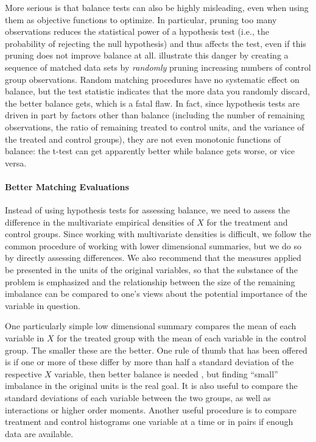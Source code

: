 \documentclass[11pt,titlepage]{article}
\begin{document}
More serious is that balance tests can also be highly misleading, even
when using them as objective functions to optimize.  In particular,
pruning too many observations reduces the statistical power of a
hypothesis test (i.e., the probability of rejecting the null
hypothesis) and thus affects the test, even if this pruning does not
improve balance at all.  \citet{ImaKinStu05} illustrate this danger by
creating a sequence of matched data sets by \emph{randomly} pruning
increasing numbers of control group observations.  Random matching
procedures have no systematic effect on balance, but the test
statistic indicates that the more data you randomly discard, the
better balance gets, which is a fatal flaw.  In fact, since hypothesis
tests are driven in part by factors other than balance (including the
number of remaining observations, the ratio of remaining treated to
control units, and the variance of the treated and control groups),
they are not even monotonic functions of balance: the t-test can get
apparently better while balance gets worse, or vice versa.

\paragraph{Better Matching Evaluations}

Instead of using hypothesis tests for assessing balance, we need to
assess the difference in the multivariate empirical densities of $X$
for the treatment and control groups.  Since working with multivariate
densities is difficult, we follow the common procedure of working with
lower dimensional summaries, but we do so by directly assessing
differences.  We also recommend that the measures applied be presented
in the units of the original variables, so that the substance of the
problem is emphasized and the relationship between the size of the
remaining imbalance can be compared to one's views about the potential
importance of the variable in question.

One particularly simple low dimensional summary compares the mean of
each variable in $X$ for the treated group with the mean of each
variable in the control group.  The smaller these are the better.  One
rule of thumb that has been offered is if one or more of these differ
by more than half a standard deviation of the respective $X$ variable,
then better balance is needed \citep{Cochran68}, but finding ``small''
imbalance in the original units is the real goal.  It is also useful
to compare the standard deviations of each variable between the two
groups, as well as interactions or higher order moments.  Another
useful procedure is to compare treatment and control histograms one
variable at a time or in pairs if enough data are available.
\end{document}
